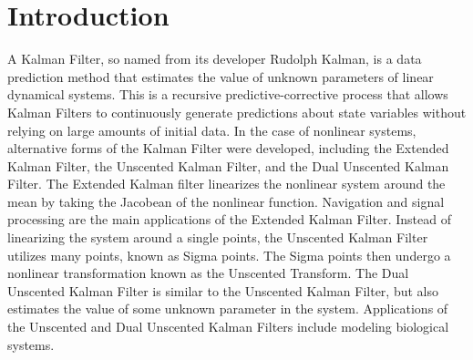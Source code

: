 \chapter{Introduction}
\label{Introduction}

A Kalman Filter, so named from its developer Rudolph Kalman, is a data prediction method that estimates the value of unknown parameters of linear dynamical systems. This is a recursive predictive-corrective process that allows Kalman Filters to continuously generate predictions about state variables without relying on large amounts of initial data.  In the case of nonlinear systems, alternative forms of the Kalman Filter were developed, including the Extended Kalman Filter, the Unscented Kalman Filter, and the Dual Unscented Kalman Filter. The Extended Kalman filter linearizes the nonlinear system around the mean by taking the Jacobean of the nonlinear function. Navigation and signal processing are the main applications of the Extended Kalman Filter. Instead of linearizing the system around a single points, the Unscented Kalman Filter utilizes many points, known as Sigma points. The Sigma points then undergo a nonlinear transformation known as the Unscented Transform. The Dual Unscented Kalman Filter is similar to the Unscented Kalman Filter, but also estimates the value of some unknown parameter in the system. Applications of the Unscented and Dual Unscented Kalman Filters include modeling biological systems.



